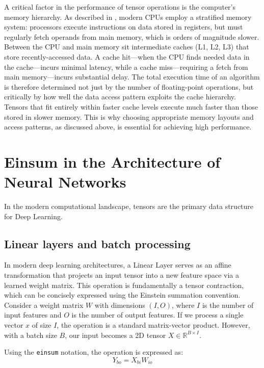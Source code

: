 \documentclass[binding=0.6cm]{sapthesis}
\begin{document}
A critical factor in the performance of tensor operations is the computer's memory hierarchy. As described in \cite{patterson2018computer}, modern CPUs employ a stratified memory system: processors execute instructions on data stored in registers, but must regularly fetch operands from main memory, which is orders of magnitude slower. Between the CPU and main memory sit intermediate caches (L1, L2, L3) that store recently-accessed data. A cache hit---when the CPU finds needed data in the cache---incurs minimal latency, while a cache miss---requiring a fetch from main memory---incurs substantial delay. The total execution time of an algorithm is therefore determined not just by the number of floating-point operations, but critically by how well the data access pattern exploits the cache hierarchy. Tensors that fit entirely within faster cache levels execute much faster than those stored in slower memory. This is why choosing appropriate memory layouts and access patterns, as discussed above, is essential for achieving high performance.
\section{Einsum in the Architecture of Neural Networks}

In the modern computational landscape, tensors are the primary data structure for Deep Learning.

\subsection{Linear layers and batch processing}

In modern deep learning architectures, a Linear Layer serves as an affine transformation that projects an input tensor into a new feature space via a learned weight matrix.
This operation is fundamentally a tensor contraction, which can be concisely expressed using the Einstein summation convention.
Consider a weight matrix $W$ with dimensions $(I, O)$, where $I$ is the number of input features and $O$ is the number of output features.
If we process a single vector $x$ of size $I$, the operation is a standard matrix-vector product. However, with a batch size $B$,
our input becomes a 2D tensor $X \in \mathbb{R}^{B \times I}$.

Using the \texttt{einsum} notation, the operation is expressed as:
\begin{equation}
	Y_{bo} = X_{bi} W_{io}
\end{equation}
\end{document}
